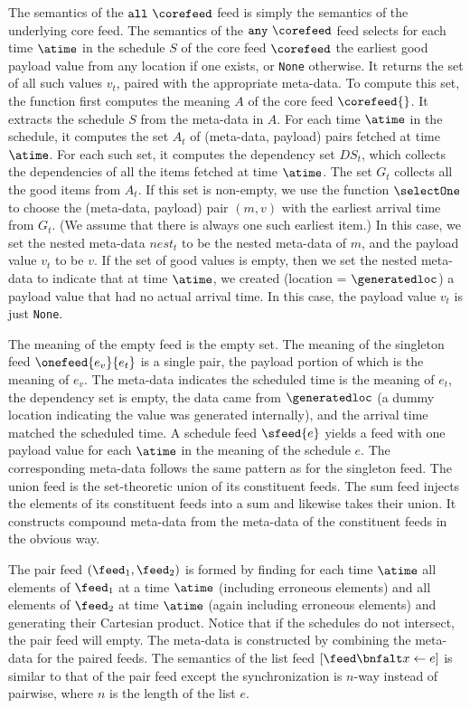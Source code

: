 The semantics of the $\mathtt{all}\ \corefeed$ feed is simply the semantics
of the underlying core feed.
The semantics of the $\mathtt{any}\ \corefeed$ feed selects for each
time $\atime$ in the schedule $S$ of the core feed $\corefeed$ the
earliest good payload value from any location if one exists, or
\texttt{None} otherwise.  It returns the set of all such values
$v_t$, paired with the appropriate meta-data.  
To compute this set, the function first computes
the meaning $A$ of the core feed $\corefeed{}$.  It extracts the
schedule $S$ from the meta-data in $A$.  For each time $\atime$ in the
schedule, it computes the set $A_t$ of (meta-data, payload) pairs
fetched at time $\atime$.  For each such set, it computes the
dependency set $DS_t$, which collects the dependencies of all the
items fetched at time $\atime$.  The set $G_t$ collects all the good
items from $A_t$. If this set is non-empty, we use the function 
$\selectOne$ to choose the (meta-data, payload) pair $(m,v)$ with the
earliest arrival time from $G_t$.  (We assume that there is always one
such earliest item.)  In this case, we set the nested
meta-data $nest_t$ to be the nested meta-data of $m$, and the payload
value $v_t$ to be $v$.  If the set of good values is empty, then we set the nested
meta-data to indicate that at time $\atime$, we created (location =
$\generatedloc$) a payload value that had no actual
arrival time.  In this case, the payload value $v_t$ is
just \texttt{None}. 

The meaning of the empty feed is the empty set.  
The meaning of the singleton feed $\onefeed{e_v}{e_t}$ is a single
pair, the payload portion of which is the meaning of $e_v$.  The
meta-data indicates the scheduled time is the meaning of $e_t$, the dependency
set is empty, the data came from $\generatedloc$ (a dummy location
indicating the value was generated internally), and the arrival time
matched the scheduled time. 
A schedule feed $\sfeed{e}$ yields a feed with one payload value for
each $\atime$ in the meaning of the schedule $e$.  The corresponding
meta-data follows the same pattern as for the singleton feed.  
The union feed is the set-theoretic union of its constituent
feeds. The sum feed injects the elements of its constituent
feeds into a sum and likewise takes their union.  It constructs
compound meta-data from the meta-data of the constituent feeds in the
obvious way.

The pair feed $(\feed_1,\feed_2)$ is formed by finding for each time
$\atime$ all elements
of $\feed_1$ at a time $\atime$ (including erroneous elements) and all
elements of $\feed_2$ at time $\atime$ (again including erroneous
elements) and generating their Cartesian product.  Notice that 
if the schedules do not intersect, the pair feed will empty.  The
meta-data is constructed by combining the meta-data for the paired
feeds.
The semantics of the list feed $[\feed \bnfalt x \leftarrow e ]$ is
similar to that of the pair feed except the synchronization is $n$-way
instead of pairwise, where $n$ is the length of the list $e$. 

